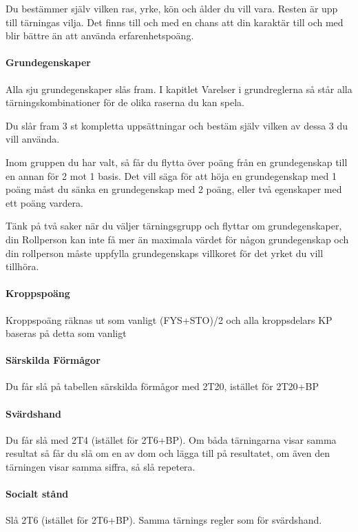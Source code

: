 \documentclass[a4paper, 10pt, titlepage]{article}
\begin{document}
Du bestämmer själv vilken ras, yrke, kön och ålder du vill vara. Resten är upp till tärningas vilja.
Det finns till och med en chans att din karaktär till och med blir bättre än att använda erfarenhetspoäng.

\paragraph{Grundegenskaper} Alla sju grundegenskaper slås fram. I kapitlet Varelser i grundreglerna så står
alla tärningskombinationer för de olika raserna du kan spela.

Du slår fram 3 st kompletta uppsättningar och bestäm själv vilken av dessa 3 du vill använda.

Inom gruppen du har valt, så får du flytta över poäng från en grundegenskap till en annan för 2 mot 1
basis. Det vill säga för att höja en grundegenskap med 1 poäng måst du sänka en grundegenskap med 2 poäng,
eller två egenskaper med ett poäng vardera.

Tänk på två saker när du väljer tärningsgrupp och flyttar om grundegenskaper, din Rollperson kan inte få
mer än maximala värdet för någon grundegenskap och din rollperson måste uppfylla grundegenskaps villkoret
för det yrket du vill tillhöra.

\paragraph{Kroppspoäng} Kroppspoäng räknas ut som vanligt (FYS+STO)/2 och alla kroppsdelars KP baseras på
detta som vanligt

\paragraph{Särskilda Förmågor} Du får slå på tabellen särskilda förmågor med 2T20, istället för 2T20+BP

\paragraph{Svärdshand} Du får slå med 2T4 (istället för 2T6+BP). Om båda tärningarna visar samma resultat
så får du slå om en av dom och lägga till på resultatet, om även den tärningen visar samma siffra, så
slå repetera.

\paragraph{Socialt stånd} Slå 2T6 (istället för 2T6+BP). Samma tärnings regler som för svärdshand.
\end{document}
